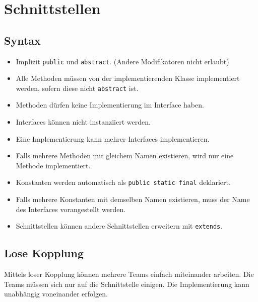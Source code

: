 \section{Schnittstellen}


\subsection{Syntax}
\begin{minipage}[t]{0.51\columnwidth}
    \raggedright%
    \begin{itemize}
        \item Implizit \lstinline{public} und \lstinline{abstract}. (Andere Modifikatoren nicht erlaubt)
        \item Alle Methoden müssen von der implementierenden Klasse implementiert werden, sofern diese nicht \lstinline{abstract} ist.
        \item Methoden dürfen keine Implementierung im Interface haben.
        \item Interfaces können nicht instanziiert werden.
        \item Eine Implementierung kann mehrer Interfaces implementieren.
        \item Falls mehrere Methoden mit gleichem Namen existieren, wird nur eine Methode implementiert.
        \item Konstanten werden automatisch als \lstinline{public static final} deklariert.
    \end{itemize}
\end{minipage}\hfill%
\begin{minipage}[t]{0.48\columnwidth}
    \vspace{-0.8\abovedisplayskip}
    
    
\end{minipage}

\begin{itemize}
    \item Falls mehrere Konstanten mit demselben Namen existieren, muss der Name des Interfaces vorangestellt werden.
    \item Schnittstellen können andere Schnittstellen erweitern mit \lstinline{extends}.
\end{itemize}


\subsection{Lose Kopplung}
Mittels loser Kopplung können mehrere Teams einfach miteinander arbeiten. 
Die Teams müssen sich nur auf die Schnittstelle einigen. 
Die Implementierung kann unabhängig voneinander erfolgen.

